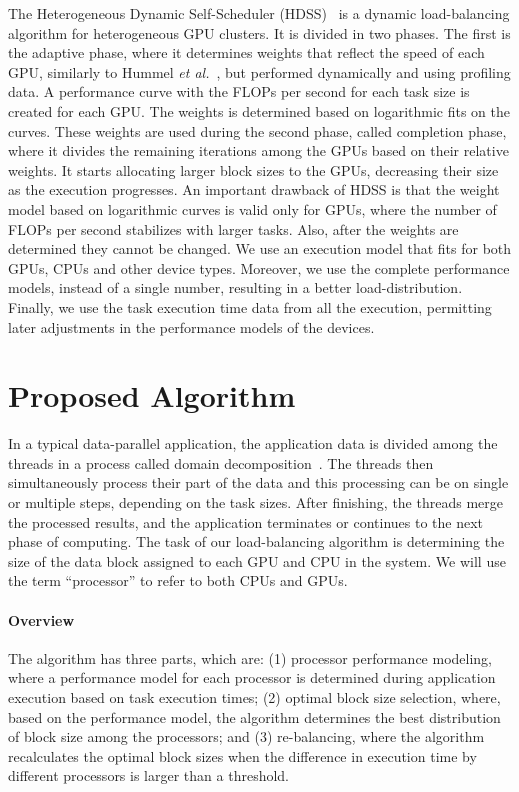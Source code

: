 \documentclass[journal]{IEEEtran}
\begin{document}
The Heterogeneous Dynamic Self-Scheduler (HDSS)~\cite{HDSS} is a dynamic
load-balancing algorithm for heterogeneous GPU clusters. It is divided in two
phases. The first is the adaptive phase, where it determines weights that
reflect the speed of each GPU, similarly to Hummel \emph{et al.}~\cite{Hummel},
but performed dynamically and using profiling data. A performance curve with the
FLOPs per second for each task size is created for each GPU. The weights is
determined based on logarithmic fits on the curves.  These weights are used
during the second phase, called completion phase, where it divides the remaining
iterations among the GPUs based on their relative weights. It starts allocating
larger block sizes to the GPUs, decreasing their size as the execution
progresses. An important drawback of HDSS is that the weight model based on
logarithmic curves is valid only for GPUs, where the number of FLOPs per second
stabilizes with larger tasks. Also, after the weights are determined they cannot
be changed. We use an execution model that fits for both GPUs, CPUs and other
device types. Moreover, we use the complete performance models, instead of a
single number, resulting in a better load-distribution. Finally, we use the task
execution time data from all the execution, permitting later adjustments in the
performance models of the devices.



\section{Proposed Algorithm}

In a typical data-parallel application, the application data is divided among
the threads in a process called domain decomposition~\cite{Gropp:1992uq}. The
threads then simultaneously process their part of the data and this processing
can be on single or multiple steps, depending on the task sizes. After
finishing, the threads merge the processed results, and the application
terminates or continues to the next phase of computing. The task of our
load-balancing algorithm is determining the size of the data block assigned to
each GPU and CPU in the system. We will use the term ``processor'' to refer to
both CPUs and GPUs.

\vspace{0.2cm}
\paragraph*{Overview} The algorithm has three parts, which are: (1) processor 
performance modeling, where a performance model for each processor is determined
during application execution based on task execution times; (2) optimal block
size selection, where, based on the performance model, the algorithm determines
the best distribution of block size among the processors; and (3) re-balancing,
where the algorithm recalculates the optimal block sizes when the difference in
execution time by different processors is larger than a threshold.
\end{document}
